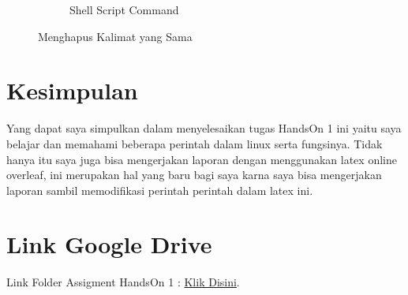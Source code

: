 \documentclass[11pt,a4paper]{article}
\begin{document}
\begin{figure}[h]
\begin{subfigure}[b]{0.4\textwidth}
		\caption{Shell Script Command}
		\label{fig:aug-2}
	\end{subfigure}
	\caption{Menghapus Kalimat yang Sama}\label{fig:aug}
\end{figure}

\section{Kesimpulan}
     Yang dapat saya simpulkan dalam menyelesaikan tugas HandsOn 1 ini yaitu saya belajar dan memahami beberapa perintah dalam linux serta fungsinya. Tidak hanya itu saya juga bisa mengerjakan laporan dengan menggunakan latex online overleaf, ini merupakan hal yang baru bagi saya karna saya bisa mengerjakan laporan sambil memodifikasi perintah perintah dalam latex ini.
     
\section{Link Google Drive}
Link Folder Assigment HandsOn 1 : \href{https://drive.google.com/drive/folders/1lQRKM7aLH1yirpGWvwh2ChhqQv5B_60c?usp=sharing}{Klik Disini}.
\end{document}
